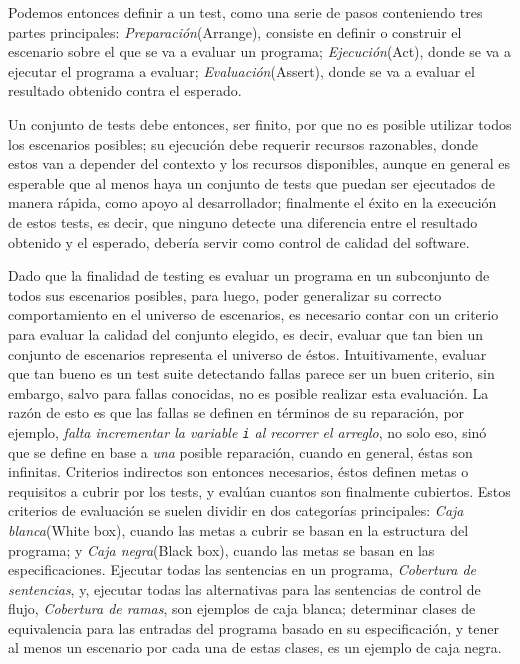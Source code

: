 Podemos entonces definir a un test, como una serie de pasos conteniendo tres partes principales: \emph{Preparaci\'on}(Arrange), consiste en definir o construir el escenario sobre el que se va a evaluar un programa; \emph{Ejecuci\'on}(Act), donde se va a ejecutar el programa a evaluar; \emph{Evaluaci\'on}(Assert), donde se va a evaluar el resultado obtenido contra el esperado.

Un conjunto de tests debe entonces, ser finito, por que no es posible utilizar todos los escenarios posibles; su ejecuci\'on debe requerir recursos razonables, donde estos van a depender del contexto y los recursos disponibles, aunque en general es esperable que al menos haya un conjunto de tests que puedan ser ejecutados de manera r\'apida, como apoyo al desarrollador; finalmente el \'exito en la execuci\'on de estos tests, es decir, que ninguno detecte una diferencia entre el resultado obtenido y el esperado, deber\'ia servir como control de calidad del software.

Dado que la finalidad de testing es evaluar un programa en un subconjunto de todos sus escenarios posibles, para luego, poder generalizar su correcto comportamiento en el universo de escenarios, es necesario contar con un criterio para evaluar la calidad del conjunto elegido, es decir, evaluar que tan bien un conjunto de escenarios representa el universo de \'estos. Intuitivamente, evaluar que tan bueno es un test suite detectando fallas parece ser un buen criterio, sin embargo, salvo para fallas conocidas, no es posible realizar esta evaluaci\'on. La raz\'on de esto es que las fallas se definen en t\'erminos de su reparaci\'on, por ejemplo, \emph{falta incrementar la variable \texttt{i} al recorrer el arreglo}, no solo eso, sin\'o que se define en base a \emph{una} posible reparaci\'on, cuando en general, \'estas son infinitas. Criterios indirectos son entonces necesarios, \'estos definen metas o requisitos a cubrir por los tests, y eval\'uan cuantos son finalmente cubiertos. Estos criterios de evaluaci\'on se suelen dividir en dos categor\'ias principales: \emph{Caja blanca}(White box), cuando las metas a cubrir se basan en la estructura del programa; y \emph{Caja negra}(Black box), cuando las metas se basan en las especificaciones. Ejecutar todas las sentencias en un programa, \emph{Cobertura de sentencias}, y, ejecutar todas las alternativas para las sentencias de control de flujo, \emph{Cobertura de ramas}, son ejemplos de caja blanca; determinar clases de equivalencia para las entradas del programa basado en su especificaci\'on, y tener al menos un escenario por cada una de estas clases, es un ejemplo de caja negra.

